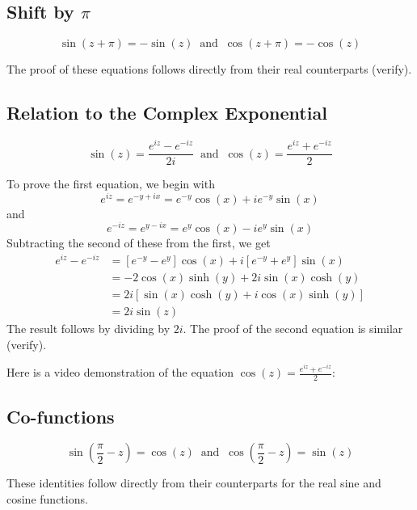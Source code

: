 \documentclass[handout]{ximera}
\begin{document}
\subsection{Shift by $\pi$}
\begin{proposition}
\[
\sin(z + \pi) = -\sin(z) \;\; \mbox{and} \;\; \cos(z+\pi) = -\cos(z)
\]
\end{proposition}
The proof of these equations follows directly from their real counterparts (verify).

\subsection{Relation to the Complex Exponential}
\begin{proposition}
\[
\sin(z) = \frac{e^{iz} - e^{-iz}}{2i} \;\; \mbox{and} \;\;  \cos(z) = \frac{e^{iz} + e^{-iz}}{2}
\]
\end{proposition}
To prove the first equation, we begin with
\[
e^{iz} = e^{-y+ix} = e^{-y}\cos(x) + ie^{-y}\sin(x)
\]
and
\[
e^{-iz} = e^{y-ix} = e^{y}\cos(x) - ie^{y}\sin(x)
\]
Subtracting the second of these from the first, we get
\begin{align*}
e^{iz} - e^{-iz} &= \left[e^{-y}-e^y\right]\cos(x) + i\left[e^{-y}+e^y\right]\sin(x)\\
&=-2\cos(x) \sinh(y) +2i \sin(x)\cosh(y)\\
& = 2i\left[\sin(x)\cosh(y) + i \cos(x)\sinh(y)\right]\\
&=2i\sin(z)
\end{align*}
The result follows by dividing by $2i$.
The proof of the second equation is similar (verify).

Here is a video demonstration of the equation $\cos(z) = \frac{e^{iz}+e^{-iz}}{2}$:\\
\begin{foldable}
\end{foldable}

\subsection{Co-functions}
\begin{proposition}
\[
\sin\left(\frac{\pi}{2}-z\right) = \cos(z) \;\; \mbox{and} \;\; \cos\left(\frac{\pi}{2}-z\right) = \sin(z)
\]
\end{proposition}
These identities follow directly from their counterparts for the real sine and cosine functions.
\end{document}
